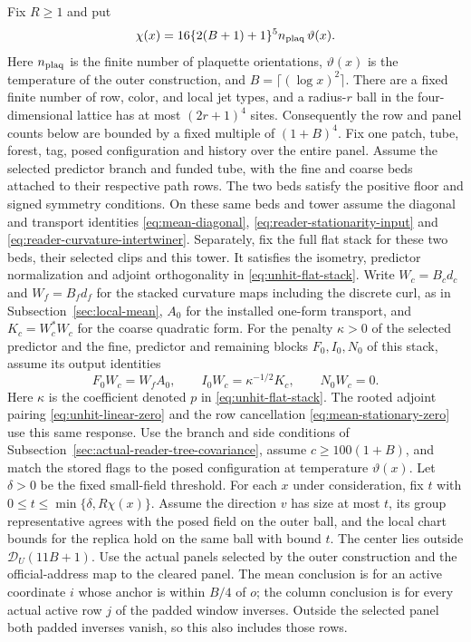 \begin{proposition}
\label{prop:ex-lattice-actual-reader-panel}
Fix $R\ge1$ and put
\[
 \chi(x)=16\{2(B+1)+1\}^5n_{\rm plaq}\,\vartheta(x).
\]
Here $n_{\rm plaq}$ is the finite number of plaquette orientations,
$\vartheta(x)$ is the temperature of the outer construction, and
$B=\lceil(\log x)^2\rceil$. There are a fixed finite
number of row, color, and local jet types, and a radius-$r$ ball in the
four-dimensional lattice has at most $(2r+1)^4$ sites. Consequently
the row and panel counts below are bounded by a fixed multiple of
$(1+B)^4$.
Fix one patch, tube, forest, tag, posed configuration and history over
the entire panel. Assume the selected predictor branch and funded
tube, with the fine and coarse beds attached to their respective path
rows. The two beds satisfy the positive floor and signed symmetry
conditions. On these same beds and tower assume the diagonal and
transport identities \eqref{eq:mean-diagonal},
\eqref{eq:reader-stationarity-input} and \eqref{eq:reader-curvature-intertwiner}.
Separately, fix the full flat stack for these two beds, their selected
clips and this tower. It satisfies the isometry, predictor normalization
and adjoint orthogonality in \eqref{eq:unhit-flat-stack}. Write
$W_c=B_c d_c$ and $W_f=B_f d_f$ for the stacked curvature maps
including the discrete curl, as in Subsection~\ref{sec:local-mean},
$A_0$ for the installed one-form transport, and $K_c=W_c^*W_c$
for the coarse quadratic form. For the penalty $\kappa>0$ of the
selected predictor and the fine, predictor and remaining blocks
$F_0,I_0,N_0$ of this stack, assume its output identities
\[
 F_0 W_c=W_f A_0,\qquad I_0 W_c=\kappa^{-1/2}K_c,\qquad N_0 W_c=0.
\]
Here $\kappa$ is the coefficient denoted $p$ in
\eqref{eq:unhit-flat-stack}. The rooted adjoint pairing
\eqref{eq:unhit-linear-zero} and the row cancellation
\eqref{eq:mean-stationary-zero} use this same response.
Use the branch and side conditions of
Subsection~\ref{sec:actual-reader-tree-covariance}, assume $c\ge100(1+B)$,
and match the stored flags to the posed configuration at temperature
$\vartheta(x)$. Let $\delta>0$ be the fixed small-field threshold.
For each $x$ under consideration, fix $t$ with
$0\le t\le\min\{\delta,R\chi(x)\}$.
Assume the direction $v$ has size at most $t$, its group representative
agrees with the posed field on the outer ball, and the local chart
bounds for the replica hold on the same ball with bound $t$. The
center lies outside $\mathcal D_U(11B+1)$. Use the
actual panels selected by the outer construction and the
official-address map to the cleared panel. The mean conclusion is for
an active coordinate $i$ whose anchor is within $B/4$ of $o$; the
column conclusion is for every actual active row $j$ of the padded
window inverses. Outside the selected panel both padded inverses
vanish, so this also includes those rows.


\end{proposition}
